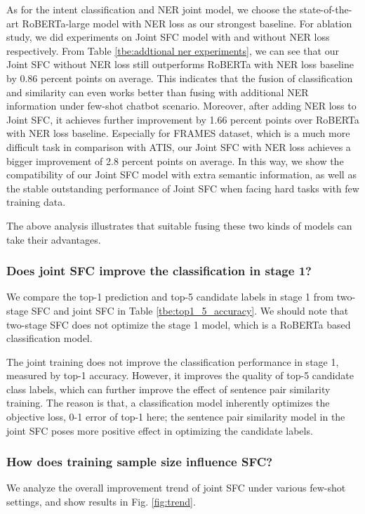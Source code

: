 As for the intent classification and NER joint model, we choose the state-of-the-art RoBERTa-large model with NER loss as our strongest baseline. For ablation study, we did experiments on Joint SFC model with and without NER loss respectively. From Table \ref{tbe:addtional ner experiments}, we can see that our Joint SFC without NER loss still outperforms RoBERTa with NER loss baseline by 0.86 percent points on average. This indicates that the fusion of classification and similarity can even works better than fusing with additional NER information under few-shot chatbot scenario. Moreover, after adding NER loss to Joint SFC, it achieves further improvement by 1.66 percent points over RoBERTa with NER loss baseline. Especially for FRAMES dataset, which is a much more difficult task in comparison with ATIS, our Joint SFC with NER loss achieves a bigger improvement of 2.8 percent points on average. In this way, we show the compatibility of our Joint SFC model with extra semantic information, as well as the stable outstanding performance of Joint SFC when facing hard tasks with few training data.

The above analysis illustrates that suitable fusing these two kinds of models
can take their advantages.

\subsubsection*{Does joint SFC improve the classification in stage 1?}
We  compare  the  top-1  prediction and top-5 candidate labels in stage 1 from
two-stage SFC and joint SFC in Table \ref{tbe:top1_5_accuracy}. We should note
that  two-stage  SFC  does not optimize the stage 1 model, which is a RoBERTa
based classification model.

The joint training does not improve the classification performance in stage 1,
measured  by  top-1  accuracy.  However,  it  improves  the  quality of top-5
candidate  class  labels, which can further improve the effect of sentence pair
similarity training. The reason is that, a classification model
inherently optimizes the objective loss, 0-1 error of top-1 here; the sentence
pair similarity model in the joint SFC poses more positive effect in optimizing the 
candidate labels.


\subsubsection*{How does training sample size influence SFC?} 
We analyze the overall  improvement  trend  of  joint SFC under various few-shot
settings, and show results in Fig. \ref{fig:trend}.

